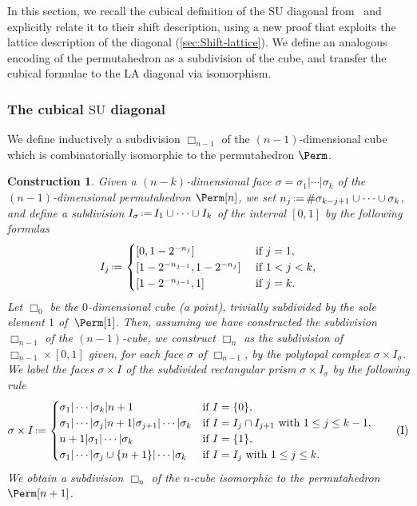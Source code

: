 \documentclass{amsart}
\newtheorem{construction}[theorem]{Construction}
\theoremstyle{definition}
\newcommand{\eqdef}{\mbox{\,\raisebox{0.2ex}{\scriptsize\ensuremath{\mathrm:}}\ensuremath{=}\,}} %
\newcommand{\card}[1]{\##1} %
\newcommand{\SU}{\mathrm{SU}}
\newcommand{\LA}{\mathrm{LA}}
\newcommand{\divcube}[1]{\Box_{#1}}
\begin{document}
In this section, we recall the cubical definition of the $\SU$ diagonal from~\cite{SaneblidzeUmble-comparingDiagonals} and explicitly relate it to their shift description, using a new proof that exploits the lattice description of the diagonal (\cref{sec:Shift-lattice}).
We define an analogous encoding of the permutahedron as a subdivision of the cube, and transfer the cubical formulae to the $\LA$ diagonal via isomorphism.

\subsubsection{The cubical $\SU$ diagonal}
We define inductively a subdivision $\divcube{n-1}$ of the $(n-1)$-dimensional cube  which is combinatorially isomorphic to the permutahedron $\Perm$.

\begin{construction}
\label{constr:cubicPermutahedron1}
Given a $(n-k)$-dimensional face $\sigma = \sigma_1| \cdots |\sigma_k$ of the $(n-1)$-dimensional permutahedron $\Perm[n]$, we set $n_j \eqdef \card{\sigma_{k-j+1}\cup\dots\cup \sigma_k}$, and define a subdivision $I_\sigma \eqdef I_1 \cup \dots \cup I_k$ of the interval $[0,1]$ by the following formulas
\begin{equation*}
	I_j \eqdef
	\begin{cases}
		\left[0,1 - 2^{-n_j}\right] & \text{ if } j=1, \\
		\left[1 - 2^{-n_{j-1}}, 1 - 2^{-n_{j}}\right]  & \text{ if } 1 < j < k, \\
		\left[1 - 2^{-n_{j-1}},1\right] & \text{ if } j=k .
	\end{cases}
\end{equation*}
Let $\divcube{0}$ be the $0$-dimensional cube (a point), trivially subdivided by the sole element $1$ of~$\Perm[1]$.
Then, assuming we have constructed the subdivision $\divcube{n-1}$ of the $(n-1)$-cube, we construct $\divcube{n}$ as the subdivision of $\divcube{n-1} \times [0,1]$ given, for each face $\sigma$ of $\divcube{n-1}$, by the polytopal complex $\sigma \times I_\sigma$. 
We label the faces $\sigma \times I$ of the subdivided rectangular prism $\sigma \times I_\sigma$ by the following rule
\begin{align} \label{eq:sub}
	\sigma \times I \eqdef
	\begin{cases}
		\sigma_1| \cdots |\sigma_k| n+1 & \text{if } I = \{0\}, \\
		\sigma_1| \cdots |\sigma_j| n+1 |\sigma_{j+1}| \cdots |\sigma_k & \text{if } I = I_j \cap I_{j+1} \text{ with } 1 \leq j \leq k-1 , \\
		n+1|\sigma_1| \cdots |\sigma_k  & \text{if } I = \{1\}, \\
		\sigma_1| \cdots |\sigma_j \cup \{n+1\}| \cdots |\sigma_k & \text{if } I = I_j \text{ with }  1\leq j \leq k.
	\end{cases} 
	\tag{I}
\end{align}
We obtain a subdivision $\divcube{n}$ of the $n$-cube isomorphic to the permutahedron $\Perm[n+1]$.
\end{construction}
\end{document}
